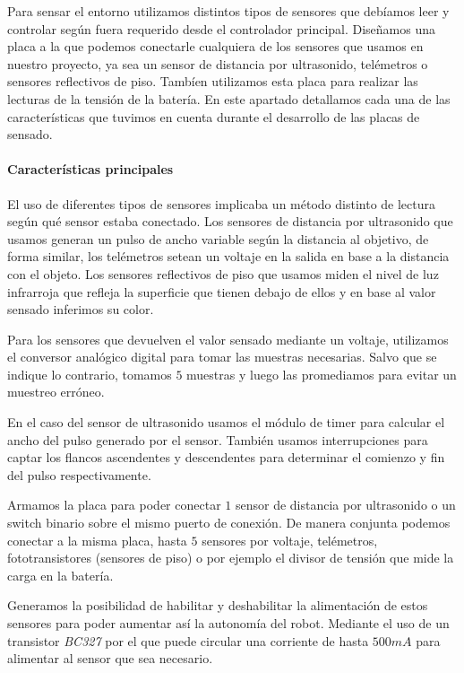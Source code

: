 Para sensar el entorno utilizamos distintos tipos de sensores que deb\'iamos leer y controlar seg\'un fuera
requerido desde el controlador principal.
Dise\~namos una placa a la que podemos conectarle cualquiera de los sensores que usamos en nuestro proyecto,
ya sea un sensor de distancia por ultrasonido, tel\'emetros o sensores reflectivos de piso.
Tamb\'ien utilizamos esta placa para realizar las lecturas de la tensi\'on de la bater\'ia.
En este apartado detallamos cada una de las caracter\'isticas que tuvimos en cuenta durante el desarrollo
de las placas de sensado.

\paragraph{Caracter\'isticas principales}
\label{h_placas_sensado_caracteristicas}

El uso de diferentes tipos de sensores implicaba un m\'etodo distinto de lectura seg\'un qu\'e sensor
estaba conectado.
Los sensores de distancia por ultrasonido que usamos generan un pulso de ancho variable seg\'un la
distancia al objetivo, de forma similar, los tel\'emetros setean un voltaje en la salida en base a la
distancia con el objeto.
Los sensores reflectivos de piso que usamos miden el nivel de luz infrarroja que refleja la superficie
que tienen debajo de ellos y en base al valor sensado inferimos su color.

Para los sensores que devuelven el valor sensado mediante un voltaje, utilizamos el conversor anal\'ogico
digital para tomar las muestras necesarias.
Salvo que se indique lo contrario, tomamos $5$ muestras y luego las promediamos para evitar un muestreo
err\'oneo.

En el caso del sensor de ultrasonido usamos el m\'odulo de timer para calcular el ancho del pulso
generado por el sensor.
Tambi\'en usamos interrupciones para captar los flancos ascendentes y descendentes para determinar el
comienzo y fin del pulso respectivamente.

Armamos la placa para poder conectar $1$ sensor de distancia por ultrasonido o un switch binario sobre
el mismo puerto de conexi\'on.
De manera conjunta podemos conectar a la misma placa, hasta $5$ sensores por voltaje, tel\'emetros,
fototransistores (sensores de piso) o por ejemplo el divisor de tensi\'on que mide la carga en la bater\'ia.

Generamos la posibilidad de habilitar y deshabilitar la alimentaci\'on de estos sensores para poder aumentar
as\'i la autonom\'ia del robot.
Mediante el uso de un transistor \emph{BC327} por el que puede circular una corriente de hasta $500mA$ para
alimentar al sensor que sea necesario.

